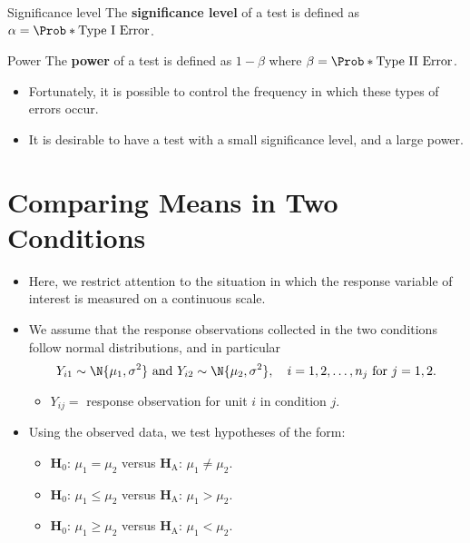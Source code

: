 \begin{Definition}{Significance level}{}
    The \textbf{significance level} of a test is defined as $ \alpha=\Prob*{\text{Type I Error}} $.
\end{Definition}
\begin{Definition}{Power}{}
    The \textbf{power} of a test is defined as $ 1-\beta $ where
    $ \beta=\Prob*{\text{Type II Error}} $.
\end{Definition}
\begin{itemize}
    \item Fortunately, it is possible to control the frequency in which these types of errors
          occur.
    \item It is desirable to have a test with a small significance level, and a large power.
\end{itemize}
\section{Comparing Means in Two Conditions}
\begin{itemize}
    \item Here, we restrict attention to the situation in which the response variable
          of interest is measured on a continuous scale.
    \item We assume that the response observations collected in the two conditions follow normal
          distributions, and in particular
          \[ Y_{i1}\sim \N{\mu_1,\sigma^2}\text{ and }Y_{i2} \sim \N{\mu_2,\sigma^2},\quad i=1,2,\ldots,n_j\text{ for } j=1,2. \]
          \begin{itemize}
              \item $ Y_{ij}= $ response observation for unit $ i $ in condition $ j $.
          \end{itemize}
    \item Using the observed data, we test hypotheses of the form:
          \begin{itemize}
              \item $ \mathbf{H}_0 $: $ \mu_1=\mu_2 $ versus $ \mathbf{H}_\text{A} $: $ \mu_1\ne\mu_2 $.
              \item $ \mathbf{H}_0 $: $ \mu_1\le\mu_2 $ versus $ \mathbf{H}_\text{A} $: $ \mu_1>\mu_2 $.
              \item $ \mathbf{H}_0 $: $ \mu_1\ge\mu_2 $ versus $ \mathbf{H}_\text{A} $: $ \mu_1<\mu_2 $.
          \end{itemize}
\end{itemize}
